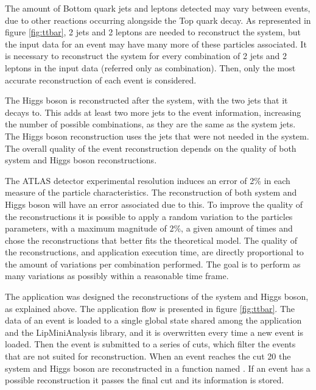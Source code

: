 The amount of Bottom quark jets and leptons detected may vary between events, due to other reactions occurring alongside the Top quark decay. As represented in figure \ref{fig:ttbar}, 2 jets and 2 leptons are needed to reconstruct the \ttbar system, but the input data for an event may have many more of these particles associated. It is necessary to reconstruct the system for every combination of 2 jets and 2 leptons in the input data (referred only as combination). Then, only the most accurate reconstruction of each event is considered.

The Higgs boson is reconstructed after the \ttbar system, with the two jets that it decays to. This adds at least two more jets to the event information, increasing the number of possible combinations, as they are the same as the \ttbar system jets. The Higgs boson reconstruction uses the jets that were not needed in the \ttbar system. The overall quality of the event reconstruction depends on the quality of both \ttbar system and Higgs boson reconstructions.

The ATLAS detector experimental resolution induces an error of 2\% in each measure of the particle characteristics. The reconstruction of both \ttbar system and Higgs boson will have an error associated due to this. To improve the quality of the reconstructions it is possible to apply a random variation to the particles parameters, with a maximum magnitude of 2\%, a given amount of times and chose the reconstructions that better fits the theoretical model. The quality of the reconstructions, and application execution time, are directly proportional to the amount of variations per combination performed. The goal is to perform as many variations as possibly within a reasonable time frame.

The \tth application was designed the reconstructions of the \ttbar system and Higgs boson, as explained above. The application flow is presented in figure \ref{fig:ttbar}. The data of an event is loaded to a single global state shared among the application and the LipMiniAnalysis library, and it is overwritten every time a new event is loaded. Then the event is submitted to a series of cuts, which filter the events that are not suited for reconstruction. When an event reaches the cut 20 the \ttbar system and Higgs boson are reconstructed in a function named \ttDilepKinFit. If an event has a possible reconstruction it passes the final cut and its information is stored.


